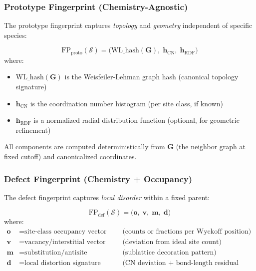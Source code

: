 \documentclass[11pt]{article}
\begin{document}
\subsubsection{Prototype Fingerprint (Chemistry-Agnostic)}

The prototype fingerprint captures \emph{topology} and \emph{geometry} independent
of specific species:

\begin{equation}
\label{eq:proto-fp}
\mathrm{FP}_{\mathrm{proto}}(\mathcal{S}) =
\Big(
\mathrm{WL\_hash}(\mathbf{G}),\;
\mathbf{h}_{\mathrm{CN}},\;
\mathbf{h}_{\mathrm{RDF}}
\Big)
\end{equation}
where:
\begin{itemize}
  \item $\mathrm{WL\_hash}(\mathbf{G})$ is the Weisfeiler-Lehman graph hash
        (canonical topology signature)
  \item $\mathbf{h}_{\mathrm{CN}}$ is the coordination number histogram
        (per site class, if known)
  \item $\mathbf{h}_{\mathrm{RDF}}$ is a normalized radial distribution function
        (optional, for geometric refinement)
\end{itemize}

All components are computed deterministically from $\mathbf{G}$ (the neighbor
graph at fixed cutoff) and canonicalized coordinates.

\subsubsection{Defect Fingerprint (Chemistry + Occupancy)}

The defect fingerprint captures \emph{local disorder} within a fixed parent:

\begin{equation}
\label{eq:defect-fp}
\mathrm{FP}_{\mathrm{def}}(\mathcal{S}) =
\Big(
\mathbf{o},\;
\mathbf{v},\;
\mathbf{m},\;
\mathbf{d}
\Big)
\end{equation}
where:
\begin{align}
\mathbf{o} &= \text{site-class occupancy vector}
  && \text{(counts or fractions per Wyckoff position)} \nonumber \\
\mathbf{v} &= \text{vacancy/interstitial vector}
  && \text{(deviation from ideal site count)} \nonumber \\
\mathbf{m} &= \text{substitution/antisite signature}
  && \text{(sublattice decoration pattern)} \nonumber \\
\mathbf{d} &= \text{local distortion signature}
  && \text{(CN deviation + bond-length residual histograms)} \nonumber
\end{align}
\end{document}
